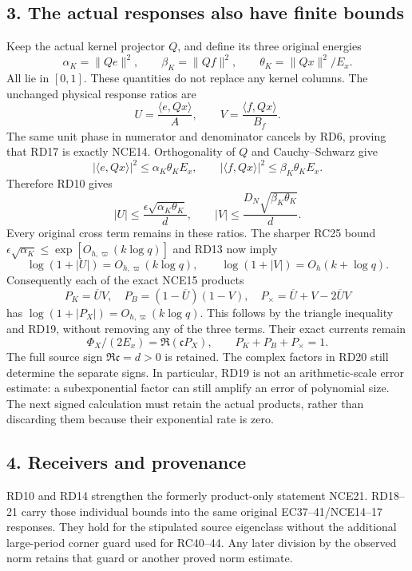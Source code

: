 \documentclass[10pt]{article}
\begin{document}
\subsection{3. The actual responses also have finite bounds}\label{the-actual-responses-also-have-finite-bounds}

Keep the actual kernel projector \(Q\), and define its three original energies \[
\alpha_K=\|Qe\|^2,\qquad \beta_K=\|Qf\|^2,
\qquad \theta_K=\|Qx\|^2/E_x.
\tag{RD16}
\] All lie in \([0,1]\). These quantities do not replace any kernel columns. The unchanged physical response ratios are \[
U=\frac{\langle e,Qx\rangle}{A},\qquad
V=\frac{\langle f,Qx\rangle}{B_f}.
\tag{RD17}
\] The same unit phase in numerator and denominator cancels by RD6, proving that RD17 is exactly NCE14. Orthogonality of \(Q\) and Cauchy--Schwarz give \[
|\langle e,Qx\rangle|^2\le\alpha_K\theta_KE_x,
\qquad
|\langle f,Qx\rangle|^2\le\beta_K\theta_KE_x.
\] Therefore RD10 gives \[
\boxed{
|U|\le\frac{\epsilon\sqrt{\alpha_K\theta_K}}d,
\qquad
|V|\le\frac{D_N\sqrt{\beta_K\theta_K}}d.
}
\tag{RD18}
\] Every original cross term remains in these ratios. The sharper RC25 bound \(\epsilon\sqrt{\alpha_K}\le\exp[O_{h,\varpi}(k\log q)]\) and RD13 now imply \[
\log(1+|U|)=O_{h,\varpi}(k\log q),\qquad
\log(1+|V|)=O_h(k+\log q).
\tag{RD19}
\] Consequently each of the exact NCE15 products \[
P_K=\overline U V,\quad P_B=(1-\overline U)(1-V),\quad
P_\times=\overline U+V-2\overline U V
\tag{RD20}
\] has \(\log(1+|P_X|)=O_{h,\varpi}(k\log q)\). This follows by the triangle inequality and RD19, without removing any of the three terms. Their exact currents remain \[
\Phi_X/(2E_x)=\Re(\mathfrak c P_X),\qquad
P_K+P_B+P_\times=1.
\tag{RD21}
\] The full source sign \(\Re\mathfrak c=d>0\) is retained. The complex factors in RD20 still determine the separate signs. In particular, RD19 is not an arithmetic-scale error estimate: a subexponential factor can still amplify an error of polynomial size. The next signed calculation must retain the actual products, rather than discarding them because their exponential rate is zero.

\subsection{4. Receivers and provenance}\label{receivers-and-provenance}

RD10 and RD14 strengthen the formerly product-only statement NCE21. RD18--21 carry those individual bounds into the same original EC37--41/NCE14--17 responses. They hold for the stipulated source eigenclass without the additional large-period corner guard used for RC40--44. Any later division by the observed norm retains that guard or another proved norm estimate.
\end{document}
